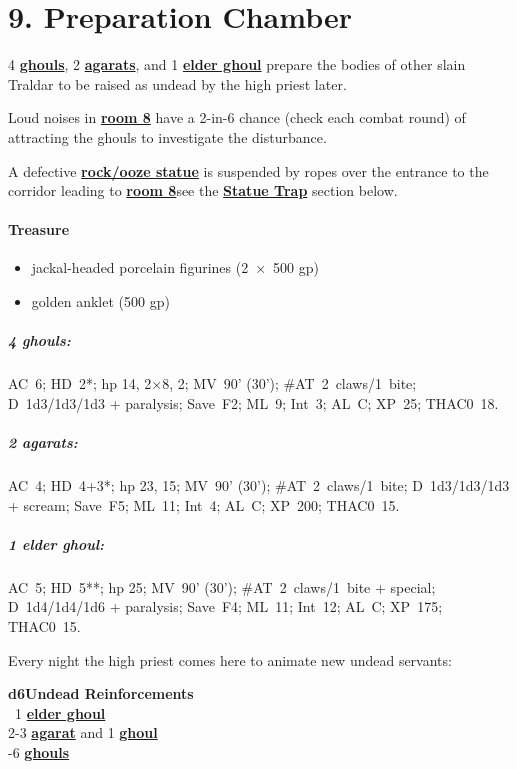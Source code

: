 \documentclass[english,11pt,openany,letterpaper,twocolumn]{book}
\begin{document}
\hypertarget{room9}{}
\section{9. Preparation Chamber}

4 \hyperlink{ghoul}{\textbf{ghouls}}, 2 \hyperlink{agarat}{\textbf{agarats}}, and 1 \hyperlink{elder-ghoul}{\textbf{elder ghoul}} prepare the bodies of other slain Traldar to be raised as undead by the high priest later.

\tab Loud noises in \hyperlink{room8}{\textbf{room 8}} have a 2-in-6 chance (check each combat round) of attracting the ghouls to investigate the disturbance.

\tab A defective \hyperlink{statue}{\textbf{rock/ooze statue}} is suspended by ropes over the entrance to the corridor leading to \hyperlink{room8}{\textbf{room 8}}\dash see the \hyperlink{statue-trap}{\textbf{Statue Trap}} section below.

\skipline
\paragraph{Treasure}
\begin{itemize}[leftmargin=*]
	\item jackal-headed porcelain figurines (2~×~500 gp)
	\item golden anklet (500 gp)
\end{itemize}


\begin{textbox}
	\subparagraph{4 ghouls:} AC~6; HD~2*; hp 14, 2×8, 2; MV~90' (30'); \#AT~2~claws/1~bite; D~1d3/1d3/1d3 + paralysis; Save~F2; ML~9; Int~3; AL~C; XP~25; THAC0~18.
	
	\subparagraph{2 agarats:} AC~4; HD~4+3*; hp 23, 15; MV~90' (30'); \#AT~2~claws/1~bite; D~1d3/1d3/1d3 + scream; Save~F5; ML~11; Int~4; AL~C; XP~200; THAC0~15.
	
	\subparagraph{1 elder ghoul:} AC~5; HD~5**; hp 25; MV~90' (30'); \#AT~2~claws/1~bite + special; D~1d4/1d4/1d6 + paralysis; Save~F4; ML~11; Int~12; AL~C; XP~175; THAC0~15.
\end{textbox}

\tab Every night the high priest comes here to animate new undead servants:

\ulf\textbf{d6}\tab\tab\textbf{Undead Reinforcements}\\
~1\tab{} \hyperlink{elder-ghoul}{\textbf{elder ghoul}}\\
2-3\tab{} \hyperlink{agarat}{\textbf{agarat}} and 1 \hyperlink{ghoul}{\textbf{ghoul}}\\
-6\tab{} \hyperlink{ghoul}{\textbf{ghouls}}
\end{document}
